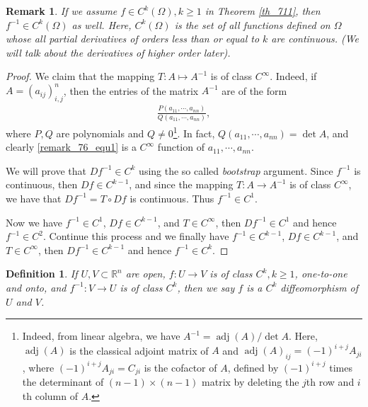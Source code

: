 \documentclass[11pt]{book}
\newtheorem{definition}{Definition}[chapter]
\newtheorem{remark}{Remark}[chapter]
\theoremstyle{definition}
\numberwithin{equation}{chapter}
\begin{document}
\medskip

\begin{remark}
If we assume $f \in C^k(\Omega), k \geq 1$ in Theorem \ref{th_711}, then $f^{-1} \in C^k(\Omega)$ as well. Here, $C^k(\Omega)$ is the set of all functions defined on $\Omega$ whose all partial derivatives of orders less than or equal to $k$ are continuous. (We will talk about the derivatives of higher order later). 
\end{remark}
\begin{proof}
We claim that the mapping $T: A \mapsto A^{-1}$ is of class $C^\infty$. Indeed, if $A = \left(a_{ij}\right)^n_{i,j}$, then the entries of the matrix $A^{-1}$ are of the form
\begin{align}\label{remark_76_equ1}
    \frac{P(a_{11}, \cdots, a_{nn})}{Q(a_{11}, \cdots, a_{nn})},
\end{align}
where $P, Q$ are polynomials and $Q \neq 0$\footnote{Indeed, from linear algebra, we have $A^{-1} = \operatorname{adj}(A)/\det A$. Here, $\operatorname{adj}(A)$ is the classical adjoint matrix of $A$ and $\operatorname{adj}(A)_{ij} = (-1)^{i+j} A_{ji}$, where $(-1)^{i+j} A_{ji} = C_{ji}$ is the cofactor of $A$, defined by $(-1)^{i+j}$ times the determinant of $(n-1) \times (n-1)$ matrix by deleting the $j$th row and $i$th column of $A$.}. In fact, $Q(a_{11}, \cdots, a_{nn}) = \det A$, and clearly \eqref{remark_76_equ1} is a $C^\infty$ function of $a_{11}, \cdots, a_{nn}$. 

We will prove that $Df^{-1} \in C^k$ using the so called {\em bootstrap} argument. Since $f^{-1}$ is continuous, then $Df \in C^{k-1}$, and since the mapping $T: A \to A^{-1}$ is of class $C^\infty$, we have that $Df^{-1} = T \circ Df$ is continuous. Thus $f^{-1} \in C^1$.  

Now we have $f^{-1} \in C^1$, $Df \in C^{k-1}$, and $T \in C^\infty$, then $Df^{-1} \in C^1$ and hence $f^{-1} \in C^2$. Continue this process and we finally have $f^{-1} \in C^{k-1}$, $Df \in C^{k-1}$, and $T \in C^\infty$, then $Df^{-1} \in C^{k-1}$ and hence $f^{-1} \in C^k$.
\end{proof}

\medskip

\begin{definition}
If $U, V \subset \mathbb{R}^n$ are open, $f: U \to V$ is of class $C^k, k \geq 1$, one-to-one and onto, and $f^{-1}: V \to U$ is of class $C^k$, then we say $f$ is a $C^k$ diffeomorphism of $U$ and $V$.
\end{definition}
\end{document}
